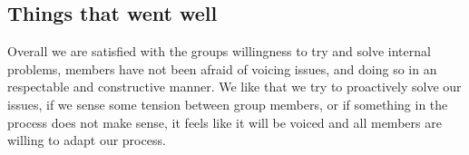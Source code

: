 \subsection{Things that went well}

Overall we are satisfied with the groups willingness to try and solve internal problems, members have not been afraid of voicing issues, and doing so in an respectable and constructive manner. We like that we try to proactively solve our issues, if we sense some tension between group members, or if something in the process does not make sense, it feels like it will be voiced and all members are willing to adapt our process. 